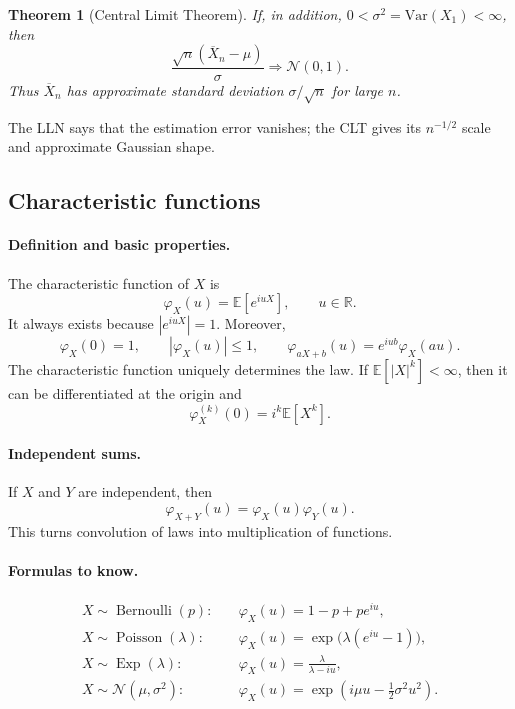 \documentclass[11pt]{article}
\newcommand{\R}{\mathbb{R}}
\newcommand{\E}{\mathbb{E}}
\newcommand{\Var}{\mathrm{Var}}
\newcommand{\1}{\mathbf{1}}
\theoremstyle{plain}
\newtheorem{theorem}{Theorem}[section]
\theoremstyle{definition}
\theoremstyle{remark}
\begin{document}
\begin{theorem}[Central Limit Theorem]
If, in addition, $0<\sigma^2=\Var(X_1)<\infty$, then
\[
\frac{\sqrt n(\overline X_n-\mu)}{\sigma}
\Rightarrow\mathcal N(0,1).
\]
Thus $\overline X_n$ has approximate standard deviation
$\sigma/\sqrt n$ for large $n$.
\end{theorem}

The LLN says that the estimation error vanishes; the CLT gives its
$n^{-1/2}$ scale and approximate Gaussian shape.

\subsection{Characteristic functions}

\paragraph{Definition and basic properties.}
The characteristic function of $X$ is
\[
\varphi_X(u)=\E[e^{iuX}],
\qquad u\in\R.
\]
It always exists because $|e^{iuX}|=1$. Moreover,
\[
\varphi_X(0)=1,
\qquad
|\varphi_X(u)|\le1,
\qquad
\varphi_{aX+b}(u)=e^{iub}\varphi_X(au).
\]
The characteristic function uniquely determines the law. If
$\E[|X|^k]<\infty$, then it can be differentiated at the origin and
\[
\varphi_X^{(k)}(0)=i^k\E[X^k].
\]

\paragraph{Independent sums.}
If $X$ and $Y$ are independent, then
\[
\varphi_{X+Y}(u)=\varphi_X(u)\varphi_Y(u).
\]
This turns convolution of laws into multiplication of functions.

\paragraph{Formulas to know.}
\begin{align*}
X\sim\operatorname{Bernoulli}(p):&\quad
\varphi_X(u)=1-p+pe^{iu},\\
X\sim\operatorname{Poisson}(\lambda):&\quad
\varphi_X(u)=\exp\!\bigl(\lambda(e^{iu}-1)\bigr),\\
X\sim\operatorname{Exp}(\lambda):&\quad
\varphi_X(u)=\frac{\lambda}{\lambda-iu},\\
X\sim\mathcal N(\mu,\sigma^2):&\quad
\varphi_X(u)=\exp\!\left(i\mu u-\frac12\sigma^2u^2\right).
\end{align*}
\end{document}
